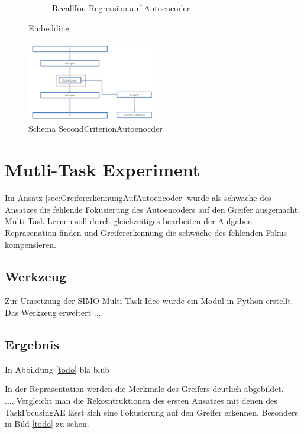 \begin{figure}[h]
\begin{subfigure}[c]{0.49\textwidth}
			\caption[Recall-IoU]{RecallIou Regression auf Autoencoder}
			\label{img:RecalllIoUt_RegressionAufAutoencoder}	
		\end{subfigure}
		\caption{Embedding}
		\label{img:Embedding}
	\end{figure}
	
		\begin{figure}[h]
		\centering
		\includegraphics[width=0.5\textwidth, center]{bilder/Schema_Autoencoders/Schema_SCAE.png}
		\caption[Schema SecondCriterionAutoenocder]{Schema SecondCriterionAutoenocder}
		\label{img:SchemaSCAE}
	\end{figure}  
	
	
	\section{Mutli-Task Experiment}
	\label{sec:MultiTaskExperiment}
	Im Ansatz \ref{sec:GreifererkennungAufAutoencoder} wurde als schwäche des Ansatzes die fehlende Fokusierung des Autoencoders auf den Greifer ausgemacht. Multi-Task-Lernen soll durch gleichzeitiges bearbeiten der Aufgaben Repräsenation finden und Greifererkennung die schwäche des fehlenden Fokus kompensieren.   
	\subsection{Werkzeug}
	Zur Umsetzung der SIMO Multi-Task-Idee wurde ein Modul in Python erstellt. Das Werkzeug erweitert ...  
	\subsection{Ergebnis}
	In Abbildung \ref{todo} bla blub
	
	In der Repräsentation werden die Merkmale des Greifers deutlich abgebildet. .....Vergleicht man die Rekosntruktionen des ersten Ansatzes mit denen des TaskFocusingAE lässt sich eine Fokusierung auf den Greifer erkennen. Besonders in Bild \ref{todo} zu sehen.
	
